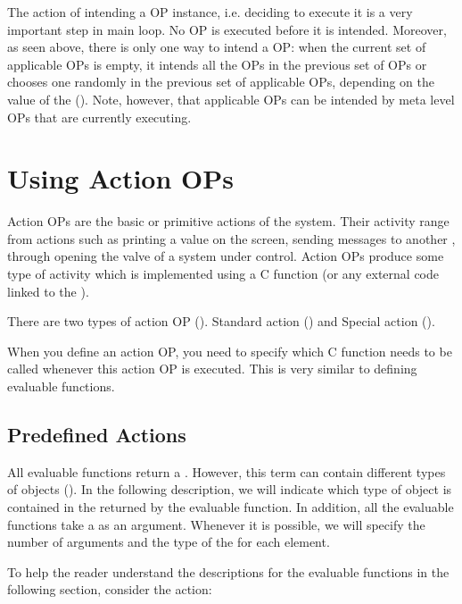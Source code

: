The action of intending a OP instance, i.e. deciding to execute it is a very
important step in \CXPK{} main loop. No OP is executed before it is intended.
Moreover, as seen above, there is only one way to intend a OP: when
the current set of applicable OPs is empty, it intends all the OPs in the
previous set of OPs or chooses one randomly in the previous set of applicable OPs,
depending on the value of the  ().  Note, however, that applicable OPs can be intended by 
meta level OPs that are currently executing.

\section{Using Action OPs}

Action OPs are the basic or primitive actions of the
system. Their activity range from actions such as printing a value on the
screen, sending messages to another \COPRS{}, through opening the valve of a
system under \COPRS{} control. Action OPs produce some type of
activity which is implemented using a C function (or any external code
linked to
the \CPK{}).

There are two types of action OP (). Standard action
() and Special action ().

When you define an action OP, you need to specify which C function needs
to be called whenever this action OP is executed. This is very similar to
defining evaluable functions.



\subsection{Predefined Actions}

All evaluable functions return a . However, this term
can contain different types of objects (). In the following
description, we will indicate which type of object is contained in the
 returned by the evaluable function. In addition, all the
evaluable functions take a  as an argument. Whenever it is
possible, we will specify the number of arguments and the type of the
 for each element.

To help the reader understand the descriptions for the evaluable functions
in the following section, consider the  action:

